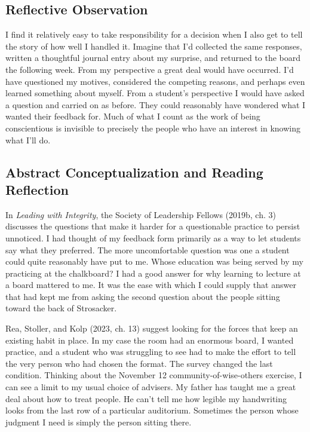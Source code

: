 \documentclass[12pt,letterpaper]{article}
\begin{document}
\subsection{Reflective Observation}
I find it relatively easy to take responsibility for a decision when I also get to tell the story of how well I handled it. Imagine that I'd collected the same responses, written a thoughtful journal entry about my surprise, and returned to the board the following week. From my perspective a great deal would have occurred. I'd have questioned my motives, considered the competing reasons, and perhaps even learned something about myself. From a student's perspective I would have asked a question and carried on as before. They could reasonably have wondered what I wanted their feedback for. Much of what I count as the work of being conscientious is invisible to precisely the people who have an interest in knowing what I'll do.

\subsection{Abstract Conceptualization and Reading Reflection}
In \textit{Leading with Integrity}, the Society of Leadership Fellows (2019b, ch. 3) discusses the questions that make it harder for a questionable practice to persist unnoticed. I had thought of my feedback form primarily as a way to let students say what they preferred. The more uncomfortable question was one a student could quite reasonably have put to me. Whose education was being served by my practicing at the chalkboard? I had a good answer for why learning to lecture at a board mattered to me. It was the ease with which I could supply that answer that had kept me from asking the second question about the people sitting toward the back of Strosacker.

Rea, Stoller, and Kolp (2023, ch. 13) suggest looking for the forces that keep an existing habit in place. In my case the room had an enormous board, I wanted practice, and a student who was struggling to see had to make the effort to tell the very person who had chosen the format. The survey changed the last condition. Thinking about the November 12 community-of-wise-others exercise, I can see a limit to my usual choice of advisers. My father has taught me a great deal about how to treat people. He can't tell me how legible my handwriting looks from the last row of a particular auditorium. Sometimes the person whose judgment I need is simply the person sitting there.
\end{document}
